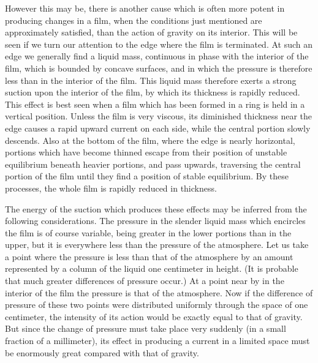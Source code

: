 \documentclass[12pt]{memoir}
\begin{document}
However this may be, there is another cause which is often more potent in producing changes in a film, when the conditions just mentioned are approximately satisfied, than the action of gravity on its interior. This will be seen if we turn our attention to the edge where the film is terminated. At such an edge we generally find a liquid mass, continuous in phase with the interior of the film, which is bounded by concave surfaces, and in which the pressure is therefore less than in the interior of the film. This liquid mass therefore exerts a strong suction upon the interior of the film, by which its thickness is rapidly reduced. This effect is best seen when a film which has been formed in a ring is held in a vertical position. Unless the film is very viscous, its diminished thickness near the edge causes a rapid upward current on each side, while the central portion slowly descends. Also at the bottom of the film, where the edge is nearly horizontal, portions which have become thinned escape from their position of unstable equilibrium beneath heavier portions, and pass upwards, traversing the central portion of the film until they find a position of stable equilibrium. By these processes, the whole film is rapidly reduced in thickness.

The energy of the suction which produces these effects may be inferred from the following considerations. The pressure in the slender liquid mass which encircles the film is of course variable, being greater in the lower portions than in the upper, but it is everywhere less than the pressure of the atmosphere. Let us take a point where the pressure is less than that of the atmosphere by an amount represented by a column of the liquid one centimeter in height. (It is probable that much greater differences of pressure occur.) At a point near by in the interior of the film the pressure is that of the atmosphere. Now if the difference of pressure of these two points were distributed uniformly through the space of one centimeter, the intensity of its action would be exactly equal to that of gravity. But since the change of pressure must take place very suddenly (in a small fraction of a millimeter), its effect in producing a current in a limited space must be enormously great compared with that of gravity.
\end{document}
